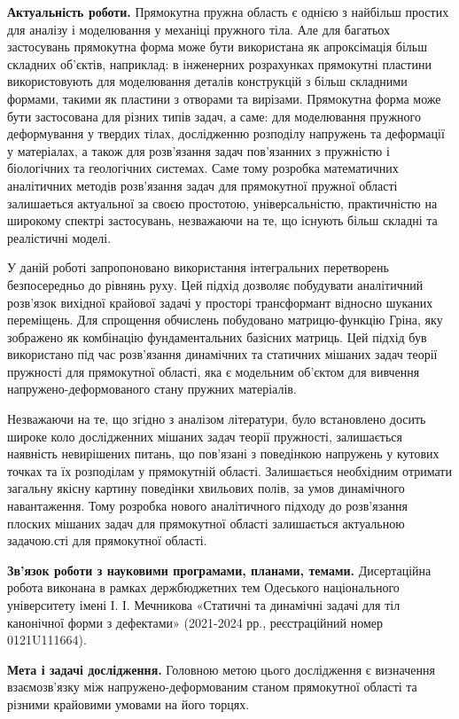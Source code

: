 \textbf{Актуальність роботи.} 
Прямокутна пружна область є однією з найбільш простих для аналізу і моделювання у механіці пружного тіла.
Але для багатьох застосувань прямокутна форма може бути використана як апроксімація більш складних об'єктів, наприклад:
в інженерних розрахунках прямокутні пластини використовують для моделювання деталів конструкцій з більш складними формами,
такими як пластини з отворами та вирізами. Прямокутна форма може бути застосована для різних типів задач, а саме:
для моделювання пружного деформування у твердих тілах, дослідженню розподілу напружень та деформації у матеріалах,
а також для розв'язання задач пов'язанних з пружністю і біологічних та геологічних системах.
Саме тому розробка математичних аналітичних методів розв'язання задач для прямокутної пружної області залишаеться актуальної за своєю простотою,
універсальністю, практичністю на широкому спектрі застосувань, незважаючи на те, що існують більш складні та реалістичні моделі.

У даній роботі запропоновано використання інтегральних перетворень безпосередньо до рівнянь руху.
Цей підхід дозволяє побудувати аналітичний розв'язок вихідної крайової задачі у просторі трансформант
відносно шуканих переміщень. Для спрощення обчислень побудовано матрицю-функцію Гріна,
яку зображено як комбінацію фундаментальних базісних матриць.
Цей підхід був використано під час розв'язання динамічних та статичних мішаних задач теорії пружності для прямокутної області,
яка є модельним об'єктом для вивчення напружено-деформованого стану пружних матеріалів.

Незважаючи на те, що згідно з аналізом літератури, було встановлено досить широке коло дослідженних мішаних задач теорії пружності,
залишається наявність невирішених питань, що пов'язані з поведінкою напружень у кутових точках та їх розподілам у прямокутній області.
Залишається необхідним отримати загальну якісну картину поведінки хвильових полів, за умов динамічного навантаження.
Тому розробка нового аналітичного підходу до розв'язання плоских мішаних задач для прямокутної області залишається актуальною задачою.сті для прямокутної області.

\textbf{Зв’язок роботи з науковими програмами, планами, темами.}
Дисертаційна робота виконана в рамках держбюджетних тем Одеського національного університету імені І. І. Мечникова
«Статичні та динамічні задачі для тіл канонічної форми з дефектами»
(2021-2024 рр., реєстраційний номер 0121U111664).

\textbf{Мета і задачі дослідження.}
Головною метою цього дослідження є визначення взаємозв'язку між напружено-деформованим станом прямокутної області та різними крайовими умовами на його торцях.

